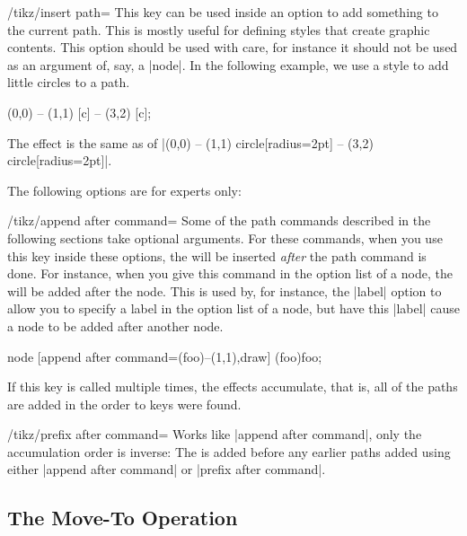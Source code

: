 \begin{key}{/tikz/insert path=}
    This key can be used inside an option to add something to the current path.
    This is mostly useful for defining styles that create graphic contents.
    This option should be used with care, for instance it should not be used as
    an argument of, say, a |node|. In the following example, we use a style to
    add little circles to a path.
\begin{codeexample}[]
\tikz [c/.style={insert path={circle[radius=2pt]}}]
  \draw (0,0) -- (1,1) [c] -- (3,2) [c];
\end{codeexample}
     The effect is the same as of
    |(0,0) -- (1,1) circle[radius=2pt] -- (3,2) circle[radius=2pt]|.
\end{key}

The following options are for experts only:

\begin{key}{/tikz/append after command=}
    Some of the path commands described in the following sections take optional
    arguments. For these commands, when you use this key inside these options,
    the  will be inserted \emph{after} the path command is done. For
    instance, when you give this command in the option list of a node, the
     will be added after the node. This is used by, for instance,
    the |label| option to allow you to specify a label in the option list of a
    node, but have this |label| cause a node to be added after another node.
\begin{codeexample}[]
\tikz \draw node [append after command={(foo)--(1,1)},draw] (foo){foo};
\end{codeexample}
    If this key is called multiple times, the effects accumulate, that is, all
    of the paths are added in the order to keys were found.
\end{key}

\begin{key}{/tikz/prefix after command=}
    Works like |append after command|, only the accumulation order is inverse:
    The  is added before any earlier paths added using either
    |append after command| or |prefix after command|.
\end{key}


\subsection{The Move-To Operation}


